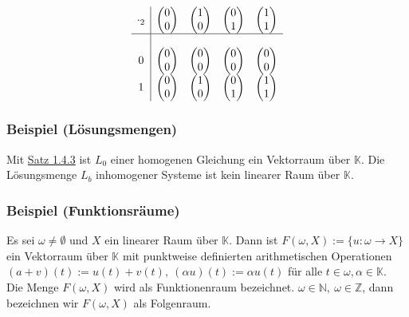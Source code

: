 \[\begin{array}{c|cccc}\cdot _2 & \begin{pmatrix}0\\ 0\end{pmatrix} & \begin{pmatrix} 1 \\ 0 \end{pmatrix} & \begin{pmatrix}0 \\ 1\end{pmatrix} & \begin{pmatrix}1\\ 1\end{pmatrix} \\ \hline \\ 0 &\begin{pmatrix}0 \\ 0\end{pmatrix} &\begin{pmatrix}0\\ 0\end{pmatrix} &\begin{pmatrix}0\\ 0\end{pmatrix} & \begin{pmatrix}0\\ 0\end{pmatrix} \\ 1 &\begin{pmatrix}0 \\ 0\end{pmatrix} &\begin{pmatrix}1\\ 0\end{pmatrix} &\begin{pmatrix}0\\ 1\end{pmatrix} & \begin{pmatrix}1\\ 1\end{pmatrix}\end{array}\]
\subsubsection{Beispiel (Lösungsmengen)}
Mit \hyperref[superposition]{Satz 1.4.3} ist \hyperref[L0]{$L_0$} einer homogenen Gleichung ein Vektorraum über $\mathbb{K}$.  Die Lösungsmenge \hyperref[Lb]{$L_b$} inhomogener Systeme ist kein linearer Raum über $\mathbb{K}$.
\subsubsection{Beispiel (Funktionsräume)}
Es sei $\omega \not= \emptyset$ und $X$ ein linearer Raum über $\mathbb{K}$.  Dann ist $F(\omega ,X):=\{ u:\omega \rightarrow X\}$ ein Vektorraum über $\mathbb{K}$ mit punktweise definierten arithmetischen Operationen $(a+v)(t) := u(t)+v(t),\ (\alpha u)(t):= \alpha u(t)$ für alle $t\in\omega ,\alpha \in\mathbb{K}$.\\
Die Menge $F(\omega ,X)$ wird als Funktionenraum bezeichnet.  $\omega\in\mathbb{N},\ \omega\in\mathbb{Z}$, dann bezeichnen wir $F(\omega ,X)$ als Folgenraum.
